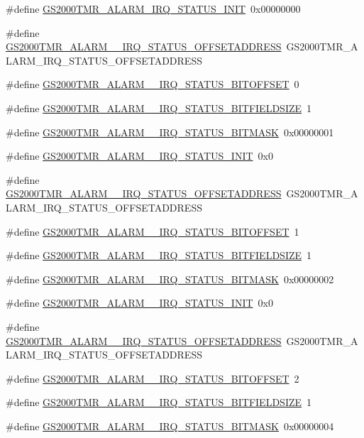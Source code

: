 \begin{DoxyCompactItemize}
\item 
\#define \hyperlink{a00556_aca66a08d87d878717553eb21ea04a03c}{GS2000TMR\_\-ALARM\_\-IRQ\_\-STATUS\_\-INIT}~0x00000000
\item 
\#define \hyperlink{a00556_ac29ddbe280250050a5ec42f82ec6d2ac}{GS2000TMR\_\-ALARM\_\_\-IRQ\_\-STATUS\_\-OFFSETADDRESS}~GS2000TMR\_\-ALARM\_\-IRQ\_\-STATUS\_\-OFFSETADDRESS
\item 
\#define \hyperlink{a00556_af4375c1f92cb3ac3a30d04c18f62db57}{GS2000TMR\_\-ALARM\_\_\-IRQ\_\-STATUS\_\-BITOFFSET}~0
\item 
\#define \hyperlink{a00556_a2f5cec8762540264c0535d1688b21c4b}{GS2000TMR\_\-ALARM\_\_\-IRQ\_\-STATUS\_\-BITFIELDSIZE}~1
\item 
\#define \hyperlink{a00556_a5dc124e8f76815c9b823e23e1e8bdf20}{GS2000TMR\_\-ALARM\_\_\-IRQ\_\-STATUS\_\-BITMASK}~0x00000001
\item 
\#define \hyperlink{a00556_a42f7a2d7eb8e2e72873fd966c50f93f1}{GS2000TMR\_\-ALARM\_\_\-IRQ\_\-STATUS\_\-INIT}~0x0
\item 
\#define \hyperlink{a00556_a99f0c398ff22ccd078b7329e285595c7}{GS2000TMR\_\-ALARM\_\_\-IRQ\_\-STATUS\_\-OFFSETADDRESS}~GS2000TMR\_\-ALARM\_\-IRQ\_\-STATUS\_\-OFFSETADDRESS
\item 
\#define \hyperlink{a00556_a9e97caf7894ad84aac9e3dd8a6b9590f}{GS2000TMR\_\-ALARM\_\_\-IRQ\_\-STATUS\_\-BITOFFSET}~1
\item 
\#define \hyperlink{a00556_aea88a14e584a4c837e5457d343d94d6c}{GS2000TMR\_\-ALARM\_\_\-IRQ\_\-STATUS\_\-BITFIELDSIZE}~1
\item 
\#define \hyperlink{a00556_ac6f24a458237d1bd3e7c52b6b8303503}{GS2000TMR\_\-ALARM\_\_\-IRQ\_\-STATUS\_\-BITMASK}~0x00000002
\item 
\#define \hyperlink{a00556_a79b413dedb08e98951f93aede6891026}{GS2000TMR\_\-ALARM\_\_\-IRQ\_\-STATUS\_\-INIT}~0x0
\item 
\#define \hyperlink{a00556_a0ca6e29f6b15a945858b4af4385aba98}{GS2000TMR\_\-ALARM\_\_\-IRQ\_\-STATUS\_\-OFFSETADDRESS}~GS2000TMR\_\-ALARM\_\-IRQ\_\-STATUS\_\-OFFSETADDRESS
\item 
\#define \hyperlink{a00556_aa726a77a5974a6b653330c55b35cb664}{GS2000TMR\_\-ALARM\_\_\-IRQ\_\-STATUS\_\-BITOFFSET}~2
\item 
\#define \hyperlink{a00556_a0a5caae02d6b484114e86cdf2a187972}{GS2000TMR\_\-ALARM\_\_\-IRQ\_\-STATUS\_\-BITFIELDSIZE}~1
\item 
\#define \hyperlink{a00556_ad348c89d077f39c5f0da23c2a3238c01}{GS2000TMR\_\-ALARM\_\_\-IRQ\_\-STATUS\_\-BITMASK}~0x00000004

\end{DoxyCompactItemize}
